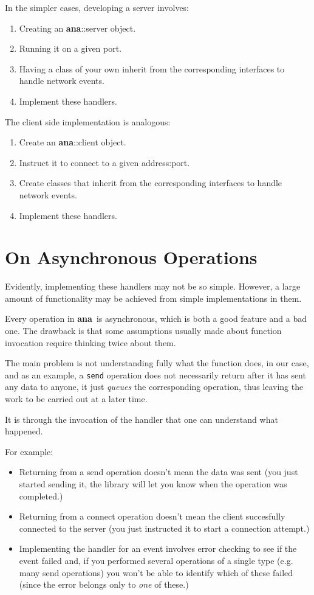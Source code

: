 \documentclass[a4paper,12pt,english]{article}
\newcommand{\ana}{\textbf{ana}}
\begin{document}
In the simpler cases, developing a server involves:
\begin{enumerate}
    \item Creating an \ana::server object.
    \item Running it on a given port.
    \item Having  a class of  your own inherit from  the corresponding
      interfaces to handle network events.
    \item Implement these handlers.
\end{enumerate}

The client side implementation is analogous:
\begin{enumerate}
    \item Create an \ana::client object.
    \item Instruct it to connect to a given address:port.
    \item   Create  classes  that   inherit  from   the  corresponding
      interfaces to handle network events.
    \item Implement these handlers.
\end{enumerate}

\section{On Asynchronous Operations}

Evidently, implementing these handlers  may not be so simple. However,
a  large   amount  of  functionality  may  be   achieved  from  simple
implementations in them.

Every  operation in  \ana  \ is  asynchronous,  which is  both a  good
feature and a  bad one. The drawback is  that some assumptions usually
made about function invocation require thinking twice about them.

The main problem is not understanding fully what the function does, in
our  case, and  as  an  example, a  \texttt{send}  operation does  not
necessarily  return after  it has  sent any  data to  anyone,  it just
\emph{queues} the corresponding operation, thus leaving the work to be
carried out at a later time.

It is  through the invocation of  the handler that  one can understand
what happened.

For example:
\begin{itemize}
    \item Returning  from a send  operation doesn't mean the  data was
      sent (you just started sending it, the library will let you know
      when the operation was completed.)
    \item Returning  from a connect operation doesn't  mean the client
      succesfully connected  to the server (you just  instructed it to
      start a connection attempt.)
    \item  Implementing  the  handler  for  an  event  involves  error
      checking  to see  if  the  event failed  and,  if you  performed
      several operations of a  single type (e.g. many send operations)
      you won't be  able to identify which of  these failed (since the
      error belongs only to \textit{one} of these.)
\end{itemize}
\end{document}
